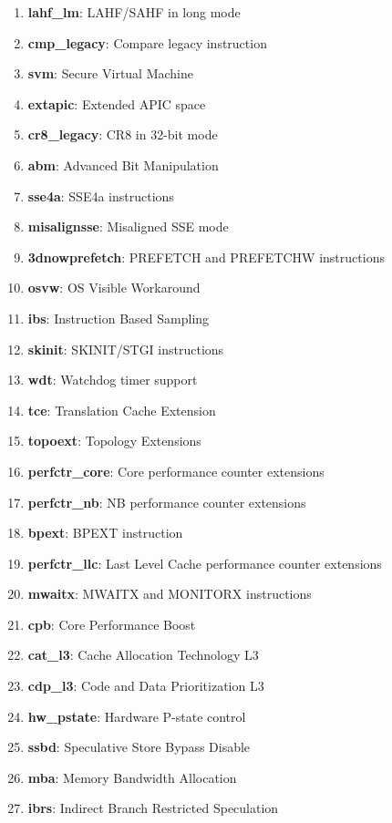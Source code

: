 \begin{multicols}{2}
\begin{enumerate}
        \item \textbf{lahf\_lm}: LAHF/SAHF in long mode
        \item \textbf{cmp\_legacy}: Compare legacy instruction
        \item \textbf{svm}: Secure Virtual Machine
        \item \textbf{extapic}: Extended APIC space
        \item \textbf{cr8\_legacy}: CR8 in 32-bit mode
        \item \textbf{abm}: Advanced Bit Manipulation
        \item \textbf{sse4a}: SSE4a instructions
        \item \textbf{misalignsse}: Misaligned SSE mode
        \item \textbf{3dnowprefetch}: PREFETCH and PREFETCHW instructions
        \item \textbf{osvw}: OS Visible Workaround
        \item \textbf{ibs}: Instruction Based Sampling
        \item \textbf{skinit}: SKINIT/STGI instructions
        \item \textbf{wdt}: Watchdog timer support
        \item \textbf{tce}: Translation Cache Extension
        \item \textbf{topoext}: Topology Extensions
        \item \textbf{perfctr\_core}: Core performance counter extensions
        \item \textbf{perfctr\_nb}: NB performance counter extensions
        \item \textbf{bpext}: BPEXT instruction
        \item \textbf{perfctr\_llc}: Last Level Cache performance counter extensions
        \item \textbf{mwaitx}: MWAITX and MONITORX instructions
        \item \textbf{cpb}: Core Performance Boost
        \item \textbf{cat\_l3}: Cache Allocation Technology L3
        \item \textbf{cdp\_l3}: Code and Data Prioritization L3
        \item \textbf{hw\_pstate}: Hardware P-state control
        \item \textbf{ssbd}: Speculative Store Bypass Disable
        \item \textbf{mba}: Memory Bandwidth Allocation
        \item \textbf{ibrs}: Indirect Branch Restricted Speculation

\end{enumerate}
\end{multicols}
